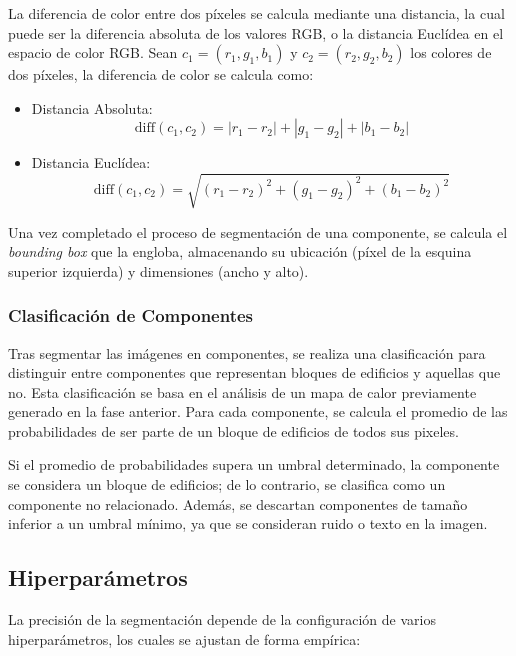 \documentclass[twocolumn, fontsize=10pt]{article}
\begin{document}
La diferencia de color entre dos píxeles se calcula mediante una distancia, la cual puede ser la diferencia absoluta de los valores RGB, o la distancia Euclídea en el espacio de color RGB. Sean $c_1 = (r_1, g_1, b_1)$ y $c_2 = (r_2, g_2, b_2)$ los colores de dos píxeles, la diferencia de color se calcula como:

\begin{itemize}
    \item Distancia Absoluta: 
     \[\text{diff}(c_1, c_2) = |r_1 - r_2| + |g_1 - g_2| + |b_1 - b_2|\] 
    \item Distancia Euclídea:
    \[\text{diff}(c_1, c_2) = \sqrt{(r_1 - r_2)^2 + (g_1 - g_2)^2 + (b_1 - b_2)^2}\]
\end{itemize}

Una vez completado el proceso de segmentación de una componente, se calcula el \textit{bounding box} que la engloba, almacenando su ubicación (píxel de la esquina superior izquierda) y dimensiones (ancho y alto).

\subsubsection{Clasificación de Componentes}
Tras segmentar las imágenes en componentes, se realiza una clasificación para distinguir entre componentes que representan bloques de edificios y aquellas que no. Esta clasificación se basa en el análisis de un mapa de calor previamente generado en la fase anterior. Para cada componente, se calcula el promedio de las probabilidades de ser parte de un bloque de edificios de todos sus pixeles.

Si el promedio de probabilidades supera un umbral determinado, la componente se considera un bloque de edificios; de lo contrario, se clasifica como un componente no relacionado. Además, se descartan componentes de tamaño inferior a un umbral mínimo, ya que se consideran ruido o texto en la imagen.

\subsection{Hiperparámetros}
La precisión de la segmentación depende de la configuración de varios hiperparámetros, los cuales se ajustan de forma empírica:
\end{document}
